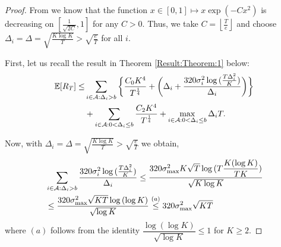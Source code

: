 \begin{proof}
\label{Proof:Corollary:1}
From \cite{bubeck2011pure}  we know that the function $x\in [0,1]\mapsto x\exp(-Cx^2)$ is  decreasing on $\left[\frac{1}{\sqrt{2C}},1\right ]$ for any $C>0$. Thus, we take $C=\left\lfloor \frac{T}{e}\right\rfloor$ and choose  $\Delta_{i}=\Delta=\sqrt{\frac{K\log K}{T}}>\sqrt{\frac{e}{T}}$ for all $i$.

First, let us recall the result in Theorem \ref{Result:Theorem:1} below:
\begin{align*}
\mathbb{E} [R_{T}] \leq &\sum\limits_{i\in \mathcal{A} :\Delta_{i} > b}\bigg\lbrace \dfrac{C_0 K^{4}}{T^{\frac{1}{4}}} + \bigg(\Delta_{i}+\dfrac{320\sigma_i^2\log{(\frac{T\Delta_{i}^{2}}{K})}}{\Delta_{i}}\bigg)\bigg \rbrace\\ 
  & +\sum\limits_{i\in \mathcal{A} :0 < \Delta_{i}\leq b} \dfrac{C_2 K^{4}}{T^{\frac{1}{4}}} + \max_{i\in \mathcal{A} :0 < \Delta_{i}\leq b}\Delta_{i}T.
\end{align*}

Now,  with  $\Delta_i =\Delta = \sqrt{\frac{K\log K}{T}}>\sqrt{\frac{e}{T}}$ we obtain,
	\begin{align*}
	&\sum_{i\in \mathcal{A} :\Delta_{i} > b}\dfrac{320\sigma_i^2\log{(\frac{T\Delta_{i}^{2}}{K})}}{\Delta_{i}} \leq  \dfrac{320\sigma_{\max}^2 K\sqrt{T}\log{(T\dfrac{K(\log K)}{T K})}}{\sqrt{K\log K}}\\ 
	&\leq  \dfrac{320\sigma_{\max}^2\sqrt{KT}\log{(\log K)}}{\sqrt{\log K}}
	\overset{(a)}{\leq} 320\sigma_{\max}^2\sqrt{KT} 
	\end{align*}		
	where $(a)$ follows from the identity $\dfrac{\log{(\log K)}}{\sqrt{\log K}}\leq 1$ for $K\geq 2$. 
	
%	


\end{proof}
